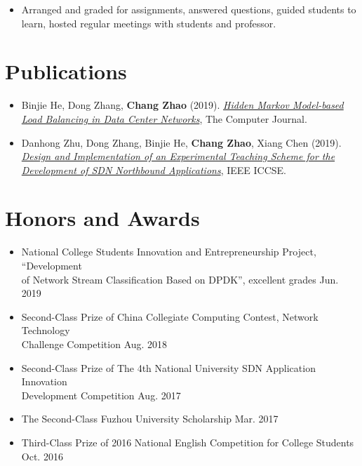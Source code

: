 \documentclass{resume}
\begin{document}
\begin{itemize}
  \item Arranged and graded for assignments, answered questions, guided students to learn, hosted regular meetings with students and professor.
\end{itemize}

\section{Publications}
\begin{itemize}
  \item Binjie He, Dong Zhang, \textbf{Chang Zhao} (2019). \href{https://academic.oup.com/comjnl/advance-article-abstract/doi/10.1093/comjnl/bxz142/5666159}{\textit{Hidden Markov Model-based Load Balancing in Data Center Networks}}, The
  Computer Journal.
  \item Danhong Zhu, Dong Zhang, Binjie He, \textbf{Chang Zhao}, Xiang Chen (2019). \href{https://ieeexplore.ieee.org/document/8845443}{\textit{Design and Implementation of an Experimental Teaching Scheme for the Development of SDN Northbound Applications}}, IEEE ICCSE.
\end{itemize}

\section{Honors and Awards}
\begin{itemize}
  \item National College Students Innovation and Entrepreneurship Project, ``Development \\of Network Stream Classification Based on DPDK'', excellent grades \hfill Jun. 2019
  \item Second-Class Prize of China Collegiate Computing Contest, Network Technology \\Challenge Competition \hfill Aug. 2018 
  \item Second-Class Prize of The 4th National University SDN Application Innovation \\Development Competition \hfill Aug. 2017
  \item The Second-Class Fuzhou University Scholarship \hfill Mar. 2017
  \item Third-Class Prize of 2016 National English Competition for College Students \hfill Oct. 2016
\end{itemize}
\end{document}
